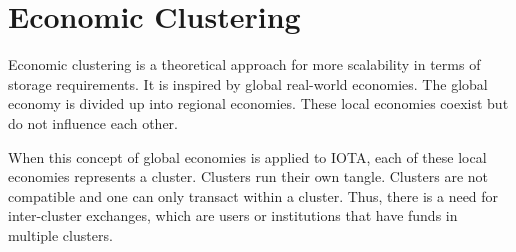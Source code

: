 \section{Economic Clustering}\label{economic-clustering}

Economic clustering is a theoretical approach for more scalability in terms of storage requirements. It is inspired by global real-world economies. The global economy is divided up into regional economies. These local economies coexist but do not influence each other. 

When this concept of global economies is applied to IOTA, each of these local economies represents a cluster. Clusters run their own tangle. Clusters are not compatible and one can only transact within a cluster. Thus, there is a need for inter-cluster exchanges, which are users or institutions that have funds in multiple clusters. 
